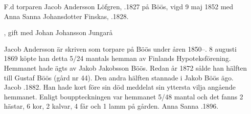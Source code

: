 %
F.d torparen Jacob Andersson Löfgren, .1827 på Böös, vigd 9 maj 1852 med Anna Sanna Johansdotter Finskas, .1828.
\begin{jhchildren}
  \item {}
  \item {}
  \item {}
  \item {}
  \item {}
  \item {}
  \item {}, gift med Johan Johansson Jungarå
  \item {}
\end{jhchildren}
Jacob Andersson är skriven som torpare på Böös under åren 1850--. 8 augusti 1869 köpte han detta 5/24 mantals hemman av Finlands Hypoteksförening. Hemmanet hade ägts av Jakob Jakobsson Böös. Redan år 1872 sålde han hälften till Gustaf Böös (gård nr 44). Den andra hälften stannade i Jakob Böös ägo. Jacob .1882. Han hade kort före sin död meddelat sin yttersta vilja angående hemmanet. Enligt bouppteckningen var hemmanet 5/48 mantal och det fanns 2 hästar, 6 kor, 2 kalvar, 4 får och 1 lamm på gården. Anna Sanna .1896.


